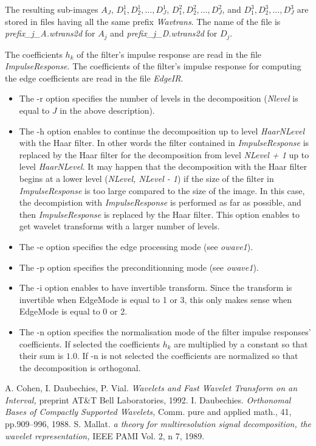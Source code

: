 The resulting sub-images $A_{J}$, $D^{1}_{1}, D^{1}_{2}, \ldots, D^{1}_{J}$, 
$D^{2}_{1}, D^{2}_{2}, \ldots, D^{2}_{J}$, and 
$D^{3}_{1}, D^{3}_{2}, \ldots, D^{3}_{J}$ are stored in files having 
all the same prefix {\em Wavtrans}. The name of the file is 
{\em prefix\_j\_A.wtrans2d} for \( A_{j} \) and {\em prefix\_j\_D.wtrans2d} 
for \( D_{j} \).

The coefficients \( h_{k} \) of the filter's impulse response are read 
in the file {\em ImpulseResponse}. The coefficients of the filter's impulse 
response for computing the edge coefficients are read 
in the file {\em EdgeIR}. 


\begin{itemize}
\item
The -r option specifies the number of levels in the decomposition 
({\em Nlevel} is equal to $J$ in the above description).
\item
The -h option enables to continue the decomposition up to level 
{\em HaarNLevel} with the Haar filter. In other words the filter 
contained in {\em ImpulseResponse} is replaced by the Haar filter 
for the decomposition from level {\em NLevel + 1} up to level 
{\em HaarNLevel}. It may happen that the decomposition with the 
Haar filter begins at a lower level ({\em NLevel, NLevel - 1}) 
if the size of the filter in {\em ImpulseResponse} is too large 
compared to the size of the image. In this case, the decompistion 
with {\em ImpulseResponse} is performed as far as possible, 
and then {\em ImpulseResponse} is replaced by the Haar filter. 
This option enables to get wavelet transforms with a larger 
number of levels. 
\item
The -e option specifies the edge processing mode (see {\em owave1}).
\item
The -p option specifies the preconditionning mode (see {\em owave1}).
\item
The -i option enables to have invertible transform. Since the transform is invertible when EdgeMode is equal to 1 or 3, this only makes sense when EdgeMode is equal to 0 or 2. 
\item
The -n option specifies the normalisation mode of the filter impulse responses' coefficients. If selected the coefficients $h_{k}$ are multiplied by a constant so that their sum is $1.0$. If -n is not selected the coefficients are normalized so that the decomposition is orthogonal. 
\end{itemize}



\begin{thebibliography}{Dau1}
 A. Cohen, I. Daubechies, P. Vial. 
{\em Wavelets and Fast Wavelet Transform on an Interval, } 
preprint AT\&T Bell Laboratories, 1992.
 I. Daubechies. 
{\em Orthonomal Bases of Compactly Supported Wavelets, } 
Comm. pure and applied math., 41, pp.909--996, 1988.
 S. Mallat. {\em a theory for multiresolution signal decomposition, the wavelet representation, } IEEE PAMI Vol. 2, n 7, 1989.



\end{thebibliography}
